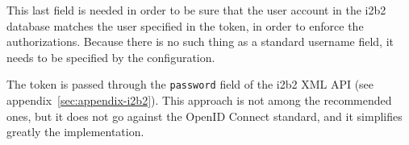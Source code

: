 This last field is needed in order to be sure that the user account in the i2b2 database matches the user specified in the token, in order to enforce the authorizations.
Because there is no such thing as a standard username field, it needs to be specified by the configuration.

The token is passed through the \verb|password| field of the i2b2 XML API (see appendix~\ref{sec:appendix-i2b2}).
This approach is not among the recommended ones, but it does not go against the OpenID Connect standard, and it simplifies greatly the implementation.







